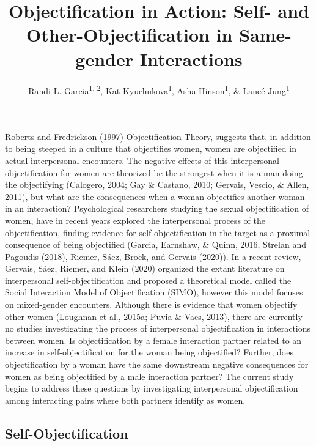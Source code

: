 \documentclass[man]{apa6}
\title{Objectification in Action: Self- and Other-Objectification in
Same-gender Interactions}
\author{Randi L. Garcia\textsuperscript{1, 2}, Kat
Kyuchukova\textsuperscript{1}, Asha Hinson\textsuperscript{1}, \& Laneé
Jung\textsuperscript{1}}
\date{}
\affiliation{
\vspace{0.5cm}
\textsuperscript{1} Department of Psychology, Smith College\\\textsuperscript{2} Program in Statistical and Data Sciences, Smith College}
\begin{document}
\maketitle

Roberts and Fredrickson (1997) Objectification Theory, suggests that, in
addition to being steeped in a culture that objectifies women, women are
objectified in actual interpersonal encounters. The negative effects of
this interpersonal objectification for women are theorized be the
strongest when it is a man doing the objectifying (Calogero, 2004; Gay
\& Castano, 2010; Gervais, Vescio, \& Allen, 2011), but what are the
consequences when a woman objectifies another woman in an interaction?
Psychological researchers studying the sexual objectification of women,
have in recent years explored the interpersonal process of the
objectification, finding evidence for self-objectification in the target
as a proximal consequence of being objectified (Garcia, Earnshaw, \&
Quinn, 2016, Strelan and Pagoudis (2018), Riemer, Sáez, Brock, and
Gervais (2020)). In a recent review, Gervais, Sáez, Riemer, and Klein
(2020) organized the extant literature on interpersonal
self-objectification and proposed a theoretical model called the Social
Interaction Model of Objectification (SIMO), however this model focuses
on mixed-gender encounters. Although there is evidence that women
objectify other women (Loughnan et al., 2015a; Puvia \& Vaes, 2013),
there are currently no studies investigating the process of
interpersonal objectification in interactions between women. Is
objectification by a female interaction partner related to an increase
in self-objectification for the woman being objectified? Further, does
objectification by a woman have the same downstream negative
consequences for women as being objectified by a male interaction
partner? The current study begins to address these questions by
investigating interpersonal objectification among interacting pairs
where both partners identify as women.

\subsection{Self-Objectification}\label{self-objectification}
\end{document}
